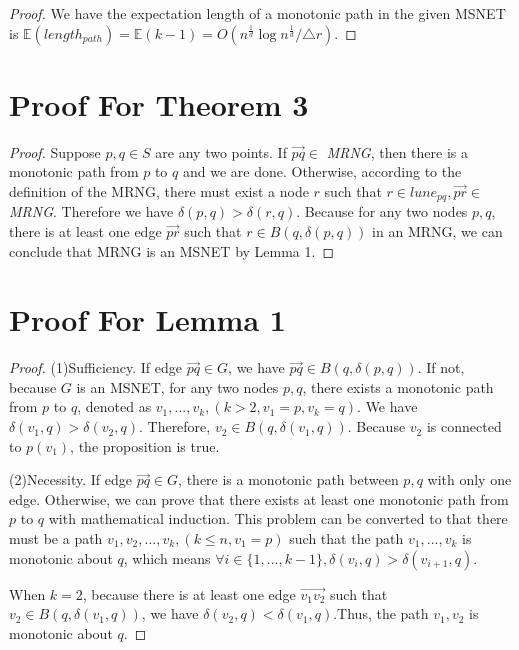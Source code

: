 \documentclass{vldb}
\begin{document}
\begin{appendix}
\begin{proof}
We have the expectation length of a monotonic path in the given MSNET is $\mathbb{E}(length_{path}) = \mathbb{E}(k-1) = O(n^{\frac{1}{d}}\log n^{\frac{1}{d}}/\triangle{r})$.

\end{proof}

\section{Proof For Theorem 3}
\begin{proof}
Suppose $p,q \in S$ are any two points. If $\overset{\longrightarrow}{pq} \in$ \textit{MRNG}, then there is a monotonic path from $p$ to $q$ and we are done. Otherwise, according to the definition of the MRNG, there must exist a node $r$ such that $r \in lune_{pq}, \overset{\longrightarrow}{pr} \in$ \textit{MRNG}. Therefore we have $\delta(p,q) >\delta(r,q)$. Because for any two nodes $p,q$, there is at least one edge $\overset{\longrightarrow}{pr}$ such that $r \in B(q, \delta(p,q))$ in an MRNG, we can conclude that MRNG is an MSNET by Lemma 1.
\end{proof}

\section{Proof For Lemma 1}
\begin{proof}
(1)Sufficiency. If edge $\overset{\longrightarrow}{pq} \in G$, we have $\overset{\longrightarrow}{pq} \in B(q, \delta(p,q))$. If not, because $G$ is an MSNET, for any two nodes $p,q$, there exists a monotonic path from $p$ to $q$, denoted as $v_1,...,v_k, (k>2, v_1=p, v_k=q)$. We have $\delta(v_1,q) > \delta(v_2,q)$. Therefore, $v_2 \in B(q, \delta(v_1,q))$. Because $v_2$ is connected to $p(v_1)$, the proposition is true. 

(2)Necessity. If edge $\overset{\longrightarrow}{pq} \in G$, there is a monotonic path between $p,q$ with only one edge. Otherwise, we can prove that there exists at least one monotonic path from $p$ to $q$ with mathematical induction. This problem can be converted to that there must be a path $v_1, v_2, ... , v_k, (k\le n, v_1=p)$ such that the path $v_1, ... , v_k$ is monotonic about $q$, which means $\forall{i}\in \{1,...,k-1\}, \delta(v_i, q) > \delta(v_{i+1}, q)$.

When $k=2$, because there is at least one edge $\overset{\longrightarrow}{v_1v_2}$ such that $v_2 \in B(q, \delta(v_1,q))$, we have $\delta(v_2,q) < \delta(v_1,q)$.Thus, the path $v_1,v_2$ is monotonic about $q$. 


\end{proof}
\end{appendix}
\end{document}
